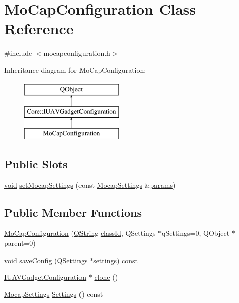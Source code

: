 \hypertarget{class_mo_cap_configuration}{\section{Mo\-Cap\-Configuration Class Reference}
\label{class_mo_cap_configuration}
}


{\ttfamily \#include $<$mocapconfiguration.\-h$>$}

Inheritance diagram for Mo\-Cap\-Configuration\-:\begin{figure}[H]
\begin{center}
\leavevmode
\includegraphics[height=3.000000cm]{class_mo_cap_configuration}
\end{center}
\end{figure}
\subsection*{Public Slots}
\begin{DoxyCompactItemize}
\item 
\hyperlink{group___u_a_v_objects_plugin_ga444cf2ff3f0ecbe028adce838d373f5c}{void} \hyperlink{group___h_i_t_l_plugin_ga1c9c0bbef4c538125abfd27b6fc47208}{set\-Mocap\-Settings} (const \hyperlink{group___mo_cap_plugin_ga6083347a5b3eb70e360f599354dc0f0b}{Mocap\-Settings} \&\hyperlink{glext_8h_afeb6390ab3bc8a0e96a88aff34d52288}{params})
\end{DoxyCompactItemize}
\subsection*{Public Member Functions}
\begin{DoxyCompactItemize}
\item 
\hyperlink{group___h_i_t_l_plugin_ga98e918c3063a6ec66da51a9532174cc8}{Mo\-Cap\-Configuration} (\hyperlink{group___u_a_v_objects_plugin_gab9d252f49c333c94a72f97ce3105a32d}{Q\-String} \hyperlink{group___core_plugin_gac953657221ba7fda967ada0408332641}{class\-Id}, Q\-Settings $\ast$q\-Settings=0, Q\-Object $\ast$parent=0)
\item 
\hyperlink{group___u_a_v_objects_plugin_ga444cf2ff3f0ecbe028adce838d373f5c}{void} \hyperlink{group___h_i_t_l_plugin_ga4890815d185a0393db178dd686be0bdb}{save\-Config} (Q\-Settings $\ast$\hyperlink{group___h_i_t_l_plugin_ga7211120cc5d6c7feffb594a36552a9af}{settings}) const 
\item 
\hyperlink{group___core_plugin_gacdfdf0b1e39b5002472b76b6564ce51f}{I\-U\-A\-V\-Gadget\-Configuration} $\ast$ \hyperlink{group___h_i_t_l_plugin_gadc51635684ea1cfd6355b0ad8e0b40a6}{clone} ()
\item 
\hyperlink{group___mo_cap_plugin_ga6083347a5b3eb70e360f599354dc0f0b}{Mocap\-Settings} \hyperlink{group___h_i_t_l_plugin_ga27cf83efd45539e4f87288010c5f285a}{Settings} () const 
\end{DoxyCompactItemize}
